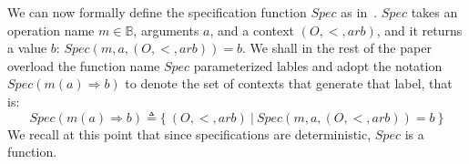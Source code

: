 We can now formally define the specification function $\mathit{Spec}$
as in~\cite{Burkhardt:2014}.
$\mathit{Spec}$ takes an operation name $m \in \mathbb{B}$, arguments
$a$, and a context $(O, <, \mathit{arb})$, and it returns a value $b$:
$\mathit{Spec}(m, a, (O, <, \mathit{arb})) = b$.
%
We shall in the rest of the paper overload the function name
$\mathit{Spec}$ parameterized lables and adopt the notation $Spec(m(a)
\Rightarrow b)$ to denote the set of contexts that generate that
label, that is:
\[Spec(m(a) \Rightarrow b) \triangleq \{\ (O, <, \mathit{arb})\ |\ Spec(m, a, (O, <, \mathit{arb})) = b\ \}\]
%
We recall at this point that since specifications are deterministic,
$\mathit{Spec}$ is a function.



